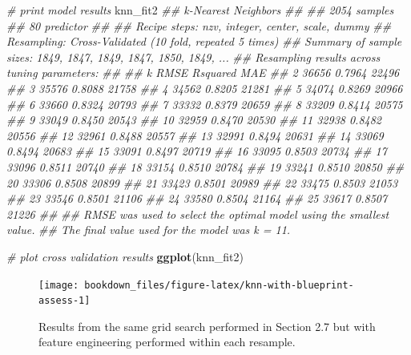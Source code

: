 \documentclass[]{krantz}
\makeatletter
\newenvironment{Shaded}{\begin{snugshade}}{\end{snugshade}}
\newcommand{\CommentTok}[1]{\textcolor[rgb]{0.37,0.37,0.37}{\textit{#1}}}
\newcommand{\KeywordTok}[1]{\textcolor[rgb]{0.27,0.27,0.27}{\textbf{#1}}}
\newcommand{\NormalTok}[1]{#1}
\newenvironment{kframe}{%
\medskip{}
\setlength{\fboxsep}{.8em}
 \def\at@end@of@kframe{}%
 \ifinner\ifhmode%
  \def\at@end@of@kframe{\end{minipage}}%
  \begin{minipage}{\columnwidth}%
 \fi\fi%
 \def\FrameCommand##1{\hskip\@totalleftmargin \hskip-\fboxsep
 \colorbox{shadecolor}{##1}\hskip-\fboxsep
     \hskip-\linewidth \hskip-\@totalleftmargin \hskip\columnwidth}%
 \MakeFramed {\advance\hsize-\width
   \@totalleftmargin\z@ \linewidth\hsize
   \@setminipage}}%
 {\par\unskip\endMakeFramed%
 \at@end@of@kframe}
\renewenvironment{Shaded}{\begin{kframe}}{\end{kframe}}
\makeatother
\begin{document}
\begin{Shaded}
\begin{Highlighting}[]
\CommentTok{# print model results}
\NormalTok{knn_fit2}
\CommentTok{## k-Nearest Neighbors }
\CommentTok{## }
\CommentTok{## 2054 samples}
\CommentTok{##   80 predictor}
\CommentTok{## }
\CommentTok{## Recipe steps: nzv, integer, center, scale, dummy }
\CommentTok{## Resampling: Cross-Validated (10 fold, repeated 5 times) }
\CommentTok{## Summary of sample sizes: 1849, 1847, 1849, 1847, 1850, 1849, ... }
\CommentTok{## Resampling results across tuning parameters:}
\CommentTok{## }
\CommentTok{##   k   RMSE   Rsquared  MAE  }
\CommentTok{##    2  36656  0.7964    22496}
\CommentTok{##    3  35576  0.8088    21758}
\CommentTok{##    4  34562  0.8205    21281}
\CommentTok{##    5  34074  0.8269    20966}
\CommentTok{##    6  33660  0.8324    20793}
\CommentTok{##    7  33332  0.8379    20659}
\CommentTok{##    8  33209  0.8414    20575}
\CommentTok{##    9  33049  0.8450    20543}
\CommentTok{##   10  32959  0.8470    20530}
\CommentTok{##   11  32938  0.8482    20556}
\CommentTok{##   12  32961  0.8488    20557}
\CommentTok{##   13  32991  0.8494    20631}
\CommentTok{##   14  33069  0.8494    20683}
\CommentTok{##   15  33091  0.8497    20719}
\CommentTok{##   16  33095  0.8503    20734}
\CommentTok{##   17  33096  0.8511    20740}
\CommentTok{##   18  33154  0.8510    20784}
\CommentTok{##   19  33241  0.8510    20850}
\CommentTok{##   20  33306  0.8508    20899}
\CommentTok{##   21  33423  0.8501    20989}
\CommentTok{##   22  33475  0.8503    21053}
\CommentTok{##   23  33546  0.8501    21106}
\CommentTok{##   24  33580  0.8504    21164}
\CommentTok{##   25  33617  0.8507    21226}
\CommentTok{## }
\CommentTok{## RMSE was used to select the optimal model using the smallest value.}
\CommentTok{## The final value used for the model was k = 11.}

\CommentTok{# plot cross validation results}
\KeywordTok{ggplot}\NormalTok{(knn_fit2)}
\end{Highlighting}
\end{Shaded}

\begin{figure}

{\centering \texttt{[image: bookdown\_files/figure-latex/knn-with-blueprint-assess-1]} 

}

\caption{Results from the same grid search performed in Section 2.7 but with feature engineering performed within each resample.}\label{fig:knn-with-blueprint-assess}
\end{figure}
\end{document}
